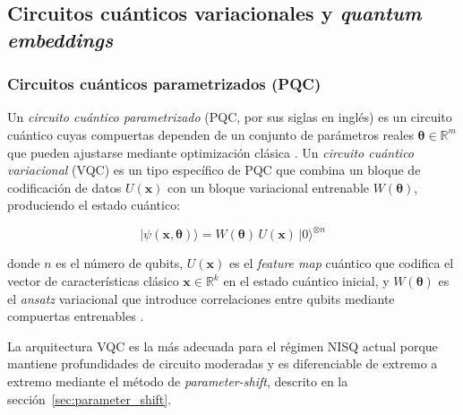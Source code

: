 
\subsection{Circuitos cuánticos variacionales y 
            \textit{quantum embeddings}}

\subsubsection{Circuitos cuánticos parametrizados (PQC)}

Un \textit{circuito cuántico parametrizado} (PQC, por sus
siglas en inglés) es un circuito cuántico cuyas compuertas
dependen de un conjunto de parámetros reales
$\boldsymbol{\theta} \in \mathbb{R}^m$ que pueden ajustarse
mediante optimización clásica \cite{cerezo2021variational}.
Un \textit{circuito cuántico variacional} (VQC) es un tipo
específico de PQC que combina un bloque de codificación de
datos $U(\mathbf{x})$ con un bloque variacional entrenable
$W(\boldsymbol{\theta})$, produciendo el estado cuántico:

\begin{equation}
  |\psi(\mathbf{x}, \boldsymbol{\theta})\rangle =
  W(\boldsymbol{\theta})\,U(\mathbf{x})\,
  |0\rangle^{\otimes n}
  \label{eq:vqc_state}
\end{equation}

\noindent donde $n$ es el número de qubits,
$U(\mathbf{x})$ es el \textit{feature map} cuántico que
codifica el vector de características clásico
$\mathbf{x} \in \mathbb{R}^k$ en el estado cuántico inicial,
y $W(\boldsymbol{\theta})$ es el \textit{ansatz} variacional
que introduce correlaciones entre qubits mediante compuertas
entrenables \cite{Schuld2019QuantumML}.

La arquitectura VQC es la más adecuada para el régimen NISQ
actual porque mantiene profundidades de circuito moderadas
y es diferenciable de extremo a extremo mediante el método
de \textit{parameter-shift}, descrito en la
sección~\ref{sec:parameter_shift}.
